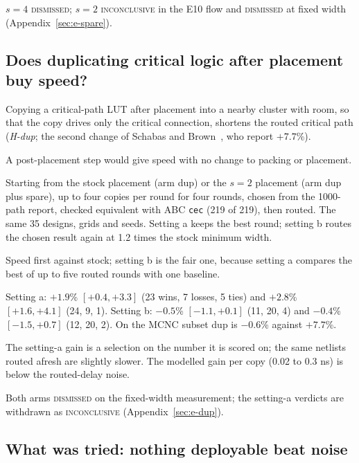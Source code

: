  $s=4$ \textsc{dismissed}; $s=2$ \textsc{inconclusive} in the E10 flow and \textsc{dismissed} at fixed width (Appendix~\ref{sec:e-spare}).

\subsection{Does duplicating critical logic after placement buy speed?}
\label{sec:r-dup}

 Copying a critical-path LUT after placement into a nearby cluster with room, so that the copy drives only the critical connection, shortens the routed critical path (\emph{H-dup}; the second change of Schabas and Brown~\cite{schabas2003duplication}, who report $+7.7$\%).

 A post-placement step would give speed with no change to packing or placement.

 Starting from the stock placement (arm dup) or the $s=2$ placement (arm dup plus spare), up to four copies per round for four rounds, chosen from the 1000-path report, checked equivalent with ABC \texttt{cec} (219 of 219), then routed. The same 35 designs, grids and seeds. Setting a keeps the best round; setting b routes the chosen result again at 1.2 times the stock minimum width.

 Speed first against stock; setting b is the fair one, because setting a compares the best of up to five routed rounds with one baseline.

 Setting a: $+1.9$\% $[+0.4,+3.3]$ (23 wins, 7 losses, 5 ties) and $+2.8$\% $[+1.6,+4.1]$ (24, 9, 1). Setting b: $-0.5$\% $[-1.1,+0.1]$ (11, 20, 4) and $-0.4$\% $[-1.5,+0.7]$ (12, 20, 2). On the MCNC subset dup is $-0.6$\% against $+7.7$\%.

 The setting-a gain is a selection on the number it is scored on; the same netlists routed afresh are slightly slower. The modelled gain per copy (0.02 to 0.3 ns) is below the routed-delay noise.

 Both arms \textsc{dismissed} on the fixed-width measurement; the setting-a verdicts are withdrawn as \textsc{inconclusive} (Appendix~\ref{sec:e-dup}).

\subsection{What was tried: nothing deployable beat noise}
\label{sec:summary}

